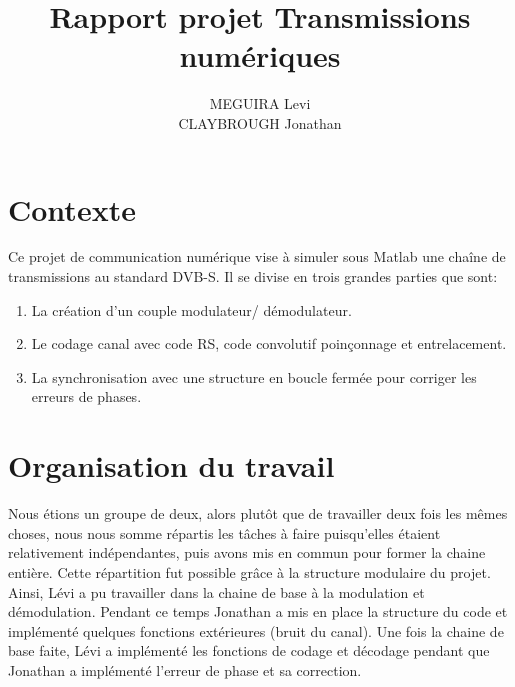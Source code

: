 \documentclass[a4paper,11pt]{article}
\title{Rapport projet Transmissions numériques}
\author{MEGUIRA Levi \\
	CLAYBROUGH Jonathan}
\begin{document}
\maketitle


\begin{comment}
	\textbf{Remarque importante: Notre chaine de transmission ne \emph{donne pas l'air} de transmettre \emph{un} signal complexe mais bien deux signaux distincts qui subissent exactement les mêmes opérations. Afin de respecter au possible le schéma de l'énoncé ainsi que le principe de ne jamais répeter de code en Matlab, il importe de créer un signal numérique \emph{réelement complexe} (sans jeu de mot) à partir des bits de départ et de transmettre un seul et même objet d'une extrémité à l'autre. \\ Le caractère universel des fonctions Matlab suffit à faire appliquer toutes les fonctions utilisés dans ce code à un vecteur complexe définie par \texttt{symboles=bitsI+j*bitsQ}}
\end{comment}



\section*{Contexte}
Ce projet de communication numérique vise à simuler sous Matlab une chaîne de transmissions au standard DVB-S. Il se divise en trois grandes parties que sont:
\begin{enumerate}
	\item La création d'un couple modulateur/ démodulateur.
	\item Le codage canal avec code RS, code convolutif poinçonnage et entrelacement.
	\item La synchronisation avec une structure en boucle fermée pour corriger les erreurs de phases.
\end{enumerate}

\tableofcontents

\section{Organisation du travail}
Nous étions un groupe de deux, alors plutôt que de travailler deux fois les mêmes choses, nous nous somme répartis les tâches à faire puisqu'elles étaient relativement indépendantes, puis avons mis en commun pour former la chaine entière.
\newline
Cette répartition fut possible grâce à la structure modulaire du projet. Ainsi, Lévi a pu travailler dans la chaine de base à la modulation et démodulation. Pendant ce temps Jonathan a mis en place la structure du code et implémenté quelques fonctions extérieures (bruit du canal).
Une fois la chaine de base faite, Lévi a implémenté les fonctions de codage et décodage pendant que Jonathan a implémenté l'erreur de phase et sa correction.
\end{document}
